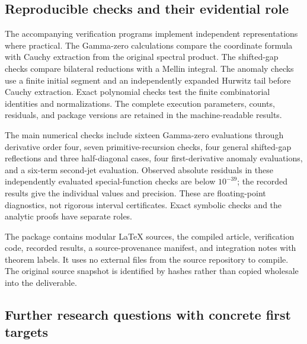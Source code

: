 \documentclass[11pt,letterpaper]{article}
\numberwithin{equation}{section}
\theoremstyle{plain}
\theoremstyle{definition}
\theoremstyle{remark}
\begin{document}
\subsection{Reproducible checks and their evidential role}

The accompanying verification programs implement independent
representations where practical. The Gamma-zero calculations compare
the coordinate formula with Cauchy extraction from the original
spectral product. The shifted-gap checks compare bilateral reductions
with a Mellin integral. The anomaly checks use a finite initial segment
and an independently expanded Hurwitz tail before Cauchy extraction.
Exact polynomial checks test the finite combinatorial identities and
normalizations. The complete execution parameters, counts, residuals,
and package versions are retained in the machine-readable results.

The main numerical checks include sixteen Gamma-zero evaluations
through derivative order four, seven primitive-recursion checks,
four general shifted-gap reflections and three half-diagonal cases,
four first-derivative anomaly evaluations, and a six-term second-jet
evaluation. Observed absolute residuals in these independently evaluated
special-function checks are below $10^{-39}$; the recorded results give
the individual values and precision. These are floating-point
diagnostics, not rigorous interval certificates. Exact symbolic checks
and the analytic proofs have separate roles.

The package contains modular \LaTeX{} sources, the compiled article,
verification code, recorded results, a source-provenance manifest,
and integration notes with theorem labels. It uses no external files
from the source repository to compile. The original source snapshot is
identified by hashes rather than copied wholesale into the deliverable.

\subsection{Further research questions with concrete first targets}
\label{sec:questions}
\end{document}
